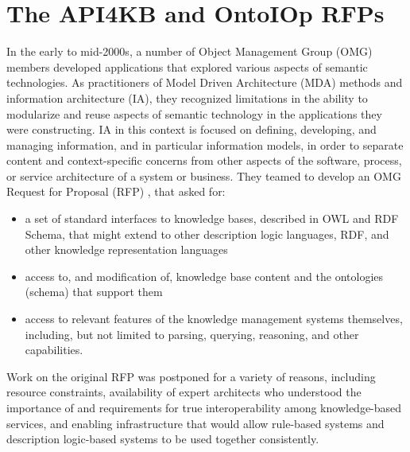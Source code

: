 \documentclass[runningheads]{llncs}
\begin{document}


\section{The API4KB and OntoIOp RFPs}
\label{sec:bg}

In the early to mid-2000s, a number of Object Management Group (OMG) members developed applications that explored various aspects of semantic technologies.  As practitioners of Model Driven Architecture (MDA) methods \cite{MDA} and information architecture (IA), they recognized limitations in the ability to modularize and reuse aspects of semantic technology in the applications they were constructing.  IA in this context is focused on defining, developing, and managing information,
and in particular information models, in order to separate content and context-specific
concerns from other aspects of the software, process, or service architecture of a system or business.  They teamed to develop an OMG Request for Proposal (RFP) \cite{API4KB}, that asked for: 
\begin{itemize}
\item  a set of standard interfaces to knowledge bases, described in OWL and RDF Schema, that might extend to other description logic languages, RDF, and other
knowledge representation languages 
\item access to, and modification of, knowledge base content and the ontologies (schema) that support them
\item access to relevant features of the knowledge management systems themselves, including, but not limited to parsing, querying, reasoning, and other capabilities.
\end{itemize}

Work on the original RFP was postponed for a variety of reasons, including resource constraints, availability of expert architects who understood the importance of and requirements for true interoperability among knowledge-based services, and enabling infrastructure that would allow rule-based systems and description logic-based systems to be used together consistently.
\end{document}
